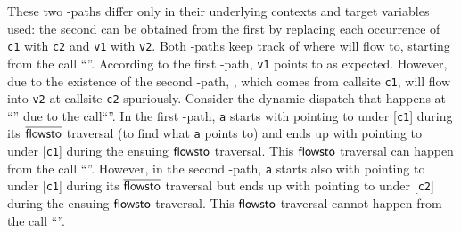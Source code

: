 These two \LFC-paths differ only in their underlying contexts  and  target variables used:
the second  can be obtained from the first by
replacing each occurrence of \texttt{c1} with \texttt{c2} and \texttt{v1} with \texttt{v2}.
Both \LFC-paths  keep track of where  will flow to,
starting from the call ``''. According to the first
\LFC-path,  \texttt{v1} points to  as
expected. However, due to the existence of the second \LFC-path, 
, which comes from callsite \texttt{c1}, will flow into \texttt{v2} at callsite \texttt{c2} spuriously.
Consider the dynamic dispatch that happens at ``''
due to the call\linebreak  ``''. 
In the first \LDC-path,
\texttt{a} starts with pointing to  under
 [\texttt{c1}]
 during its $\overline{\textsf{flowsto}}$  traversal (to find what \texttt{a} points to)
 and ends up with pointing  to  under  
  [\texttt{c1}] during
 the ensuing
 $\textsf{flowsto}$ traversal.
 This $\textsf{flowsto}$ traversal can
 happen from the call  ``''. However, in the second \LDC-path,
\texttt{a} starts also with pointing to  under
 [\texttt{c1}]
 during its $\overline{\textsf{flowsto}}$  traversal but ends up with pointing  to  under  
  [\texttt{c2}] during
 the ensuing
 $\textsf{flowsto}$ traversal. This  $\textsf{flowsto}$ traversal cannot
 happen from the call  ``''.

\begin{comment}
In both \LFC-paths,  the same $\iflowsto$  traversal is performed to find that
\texttt{a}  points to \commentfont{A1} under $\CC=[\texttt{c1}]$. However,
when returning to \texttt{a} during the following
 $\flowsto$ traversal, we traverse the same $\iflowsto$-path backwards
 under also $[\texttt{c1}$] (which can happen under under $\CC=[\texttt{c1}$]
 in the first \LFC-path but 
 and
 ends up with pointing  to \commentfont{A1} under also 
  [\texttt{c1}] during
  (which is possible under $\CC=[\texttt{c1}$]. 
 


This path contains two dispatch paths for ``\inline{a.id(o) // c3}'', 
one for  passing \texttt{o} to \texttt{p} and one for returning 
 \texttt{p} back to the same callsite. 
The first one is invalid, since \texttt{a} starts with pointing to \commentfont{A1} under
 [\texttt{c1}]
 during its $\iflowsto$  traversal but ends up with pointing  to \commentfont{A1} under  
  [\texttt{c2}] during
 the ensuing
 $\flowsto$ traversal, violating \dispatchconTwo. Thus, \LFC enables
 \commentfont{O1} passed at callsite \texttt{c1} to flow into \texttt{v2}
 at callsite \texttt{c2}  spuriously.
\end{comment}

